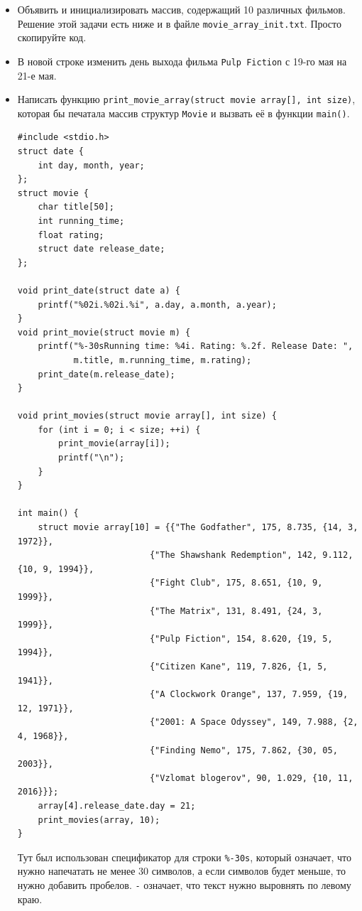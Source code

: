 \documentclass{article}
\begin{document}
\begin{itemize}
\begin{lstlisting}[backgroundcolor = \color{solcolor}]
void print_date(struct date a) {
    printf("%02i.%02i.%i\n", a.day, a.month, a.year);
}
void print_movie(struct movie m) {
    printf("%s. Running time: %i. Rating: %.2f. Release Date: ", 
           m.title, m.running_time, m.rating);
    print_date(m.release_date);
}
struct movie get_titanic() {
    struct movie result = {"Titanic", 194, 8.4, {1, 11, 1997}};
    return result;
}
int main() {
    struct movie a = {"Joker", 122, 7.98, {3, 10, 2019}};
    struct movie b = get_titanic();
    print_movie(a);
    print_movie(b);
}
\end{lstlisting}


\item Объявить и инициализировать массив, содержащий 10 различных фильмов. Решение этой задачи есть ниже и в файле \texttt{movie\_array\_init.txt}. Просто скопируйте код.

\item В новой строке изменить день выхода фильма \texttt{Pulp Fiction} с 19-го мая на 21-е мая.
\item Написать функцию \texttt{print\_movie\_array(struct movie array[], int size)}, которая бы печатала массив структур \texttt{Movie} и вызвать её в функции \texttt{main()}.

\begin{lstlisting}[backgroundcolor = \color{solcolor}]
#include <stdio.h>
struct date {
    int day, month, year;
};
struct movie {
    char title[50];
    int running_time;
    float rating;
    struct date release_date;
};

void print_date(struct date a) {
    printf("%02i.%02i.%i", a.day, a.month, a.year);
}
void print_movie(struct movie m) {
    printf("%-30sRunning time: %4i. Rating: %.2f. Release Date: ", 
           m.title, m.running_time, m.rating);
    print_date(m.release_date);
}

void print_movies(struct movie array[], int size) {
    for (int i = 0; i < size; ++i) {
        print_movie(array[i]);
        printf("\n");
    }
}

int main() {
    struct movie array[10] = {{"The Godfather", 175, 8.735, {14, 3, 1972}},
                          {"The Shawshank Redemption", 142, 9.112, {10, 9, 1994}},
                          {"Fight Club", 175, 8.651, {10, 9, 1999}},
                          {"The Matrix", 131, 8.491, {24, 3, 1999}},
                          {"Pulp Fiction", 154, 8.620, {19, 5, 1994}},
                          {"Citizen Kane", 119, 7.826, {1, 5, 1941}},
                          {"A Clockwork Orange", 137, 7.959, {19, 12, 1971}},
                          {"2001: A Space Odyssey", 149, 7.988, {2, 4, 1968}},
                          {"Finding Nemo", 175, 7.862, {30, 05, 2003}},
                          {"Vzlomat blogerov", 90, 1.029, {10, 11, 2016}}};
    array[4].release_date.day = 21;
    print_movies(array, 10);
}
\end{lstlisting}
Тут был использован спецификатор для строки \texttt{\%-30s}, который означает, что нужно напечатать не менее 30 символов, а если символов будет меньше, то нужно добавить пробелов. \texttt{-} означает, что текст нужно выровнять по левому краю.



\end{itemize}
\end{document}
